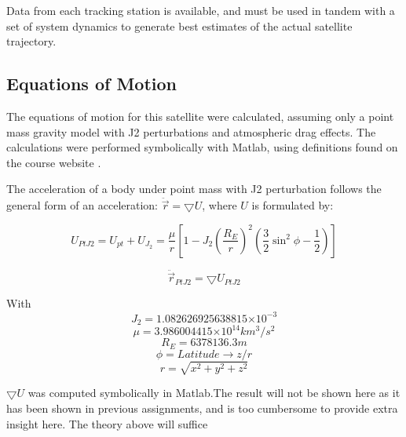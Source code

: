 \documentclass[12pt,a4paper,oneside]{article}
\numberwithin{equation}{section}   		%
\providecommand{\e}[1]{\ensuremath{\times 10^{#1}}}
\newcommand{\parens} [1] {\left(  #1  \right)}
\newcommand{\brackets} [1] {\left[ #1 \right]}
\begin{document}
Data from each tracking station is available, and must be used in tandem with a set of system dynamics to generate best estimates of the actual satellite trajectory. 


\subsection{Equations of Motion}
\label{sec:EoM}

The equations of motion for this satellite were calculated, assuming only a point mass gravity model with J2 perturbations and atmospheric drag effects. The calculations were performed symbolically with Matlab, using definitions found on the course website \cite{5070ProjectDescription}. 

The acceleration of a body under point mass with J2 perturbation follows the general form of an acceleration: $\ddot{\vec{r}} = \bigtriangledown U$, where $U$ is formulated by:

\begin{equation}
	U_{PtJ2} = U_{pt} + U_{J_2} = \frac{\mu}{r} \brackets{ 1-J_2\parens{ \frac{R_E}{r}}^2  \parens{\frac{3}{2} \sin^2 \phi - \frac{1}{2}} }
	\label{eq:Upt J2}
\end{equation}

\begin{equation}
	 \ddot{\vec{r}}_{PtJ2} = \bigtriangledown U_{PtJ2}
	\label{eq:Accl PtJ2}
\end{equation}

With
\begin{displaymath}
	J_2 = 1.082626925638815\e{-3}
\end{displaymath}
\begin{displaymath}		
	\mu = 3.986004415\e{14} km^3/s^2	
\end{displaymath}
\begin{displaymath}
	R_E = 6378136.3 m					
\end{displaymath}
\begin{displaymath}
	\phi = Latitude \rightarrow z/r			
\end{displaymath}
\begin{displaymath}
	r= \sqrt{x^2 + y^2 + z^2}				
\end{displaymath}

$ \bigtriangledown U$ was computed symbolically in Matlab.The result will not be shown here as it has been shown in previous assignments, and is too cumbersome to provide extra insight here. The theory above will suffice
\end{document}
